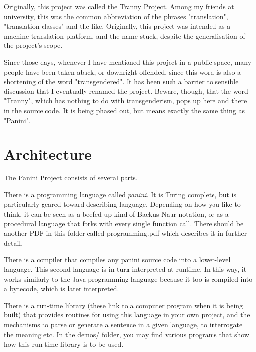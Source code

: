 \documentclass{article}
\begin{document}
Originally, this project was called the Tranny Project. Among my friends at university, this was the common abbreviation of the 
phrases "translation", "translation classes" and the like. Originally, this project was intended as a machine translation platform,
and the name stuck, despite the generalisation of the project's scope. 

Since those days, whenever I have mentioned this project in a public space, many people have been taken aback, or downright 
offended, since this word is also a shortening of the word "transgendered". It has been such a barrier to sensible discussion that I
eventually renamed the project. Beware, though, that the word "Tranny", which has nothing to do with transgenderism, pops up here and
there in the source code. It is being phased out, but means exactly the same thing as "Panini".

\section{Architecture}
The Panini Project consists of several parts.

There is a programming language called \emph{panini}. It is Turing complete, but is particularly geared toward describing language.
Depending on how you like to think, it can be seen as a beefed-up kind of Backus-Naur notation, or as a procedural language that 
forks with every single function call. There should be another PDF in this folder called programming.pdf which describes it in 
further detail.

There is a compiler that compiles any panini source code into a lower-level language. This second language is in turn interpreted at
runtime. In this way, it works similarly to the Java programming language because it too is compiled into a bytecode, which is later
interpreted.

There is a run-time library (these link to a computer program when it is being built) that provides routines for using this language
in your own project, and the mechanisms to parse or generate a sentence in a given language, to interrogate the meaning etc. In the
demos/ folder, you may find various programs that show how this run-time library is to be used.

\label{end}
\end{document}
